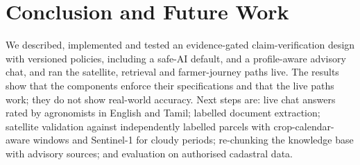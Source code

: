 \documentclass[journal]{IEEEtran}
\begin{document}
\section{Conclusion and Future Work}
We described, implemented and tested an evidence-gated claim-verification design with versioned policies, including a safe-AI default, and a profile-aware advisory chat, and ran the satellite, retrieval and farmer-journey paths live. The results show that the components enforce their specifications and that the live paths work; they do not show real-world accuracy. Next steps are: live chat answers rated by agronomists in English and Tamil; labelled document extraction; satellite validation against independently labelled parcels with crop-calendar-aware windows and Sentinel-1 for cloudy periods; re-chunking the knowledge base with advisory sources; and evaluation on authorised cadastral data.



\end{document}
